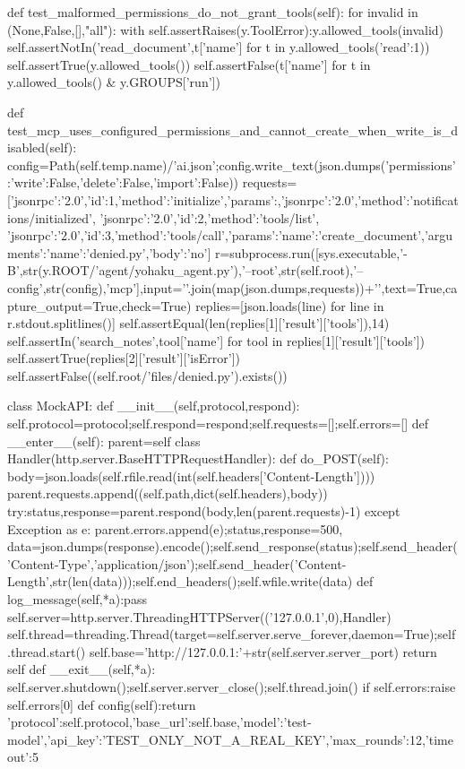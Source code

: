     def test_malformed_permissions_do_not_grant_tools(self):
        for invalid in (None,False,[],"all"):
            with self.assertRaises(y.ToolError):y.allowed_tools(invalid)
        self.assertNotIn('read_document',{t['name'] for t in y.allowed_tools({'read':1})})
        self.assertTrue(y.allowed_tools())
        self.assertFalse({t['name'] for t in y.allowed_tools()} & y.GROUPS['run'])

    def test_mcp_uses_configured_permissions_and_cannot_create_when_write_is_disabled(self):
        config=Path(self.temp.name)/'ai.json';config.write_text(json.dumps({'permissions':{'write':False,'delete':False,'import':False}}))
        requests=[{'jsonrpc':'2.0','id':1,'method':'initialize','params':{}},{'jsonrpc':'2.0','method':'notifications/initialized'},
            {'jsonrpc':'2.0','id':2,'method':'tools/list'}, {'jsonrpc':'2.0','id':3,'method':'tools/call','params':{'name':'create_document','arguments':{'name':'denied.py','body':'no'}}}]
        r=subprocess.run([sys.executable,'-B',str(y.ROOT/'agent/yohaku_agent.py'),'--root',str(self.root),'--config',str(config),'mcp'],input='\n'.join(map(json.dumps,requests))+'\n',text=True,capture_output=True,check=True)
        replies=[json.loads(line) for line in r.stdout.splitlines()]
        self.assertEqual(len(replies[1]['result']['tools']),14)
        self.assertIn('search_notes',{tool['name'] for tool in replies[1]['result']['tools']})
        self.assertTrue(replies[2]['result']['isError'])
        self.assertFalse((self.root/'files/denied.py').exists())

class MockAPI:
    def __init__(self,protocol,respond):
        self.protocol=protocol;self.respond=respond;self.requests=[];self.errors=[]
    def __enter__(self):
        parent=self
        class Handler(http.server.BaseHTTPRequestHandler):
            def do_POST(self):
                body=json.loads(self.rfile.read(int(self.headers['Content-Length'])))
                parent.requests.append((self.path,dict(self.headers),body))
                try:status,response=parent.respond(body,len(parent.requests)-1)
                except Exception as e:
                    parent.errors.append(e);status,response=500,{}
                data=json.dumps(response).encode();self.send_response(status);self.send_header('Content-Type','application/json');self.send_header('Content-Length',str(len(data)));self.end_headers();self.wfile.write(data)
            def log_message(self,*a):pass
        self.server=http.server.ThreadingHTTPServer(('127.0.0.1',0),Handler)
        self.thread=threading.Thread(target=self.server.serve_forever,daemon=True);self.thread.start()
        self.base='http://127.0.0.1:'+str(self.server.server_port)
        return self
    def __exit__(self,*a):
        self.server.shutdown();self.server.server_close();self.thread.join()
        if self.errors:raise self.errors[0]
    def config(self):return {'protocol':self.protocol,'base_url':self.base,'model':'test-model','api_key':'TEST_ONLY_NOT_A_REAL_KEY','max_rounds':12,'timeout':5}

